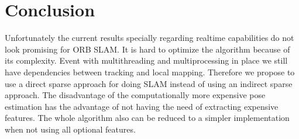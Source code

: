 \documentclass[11pt,a4paper,titlepage,oneside]{report}
\begin{document}
\chapter{Conclusion}
Unfortunately the current results specially regarding realtime capabilities do not look promising for ORB SLAM. It is hard to optimize the algorithm because of its complexity. Event with multithreading and multiprocessing in place we still have dependencies between tracking and local mapping. Therefore we propose to use a direct sparse approach for doing SLAM instead of using an indirect sparse approach. The disadvantage of the computationally more expensive pose estimation has the advantage of not having the need of extracting expensive features. The whole algorithm also can be reduced to a simpler implementation when not using all optional features.

\listoffigures
 
\end{document}
